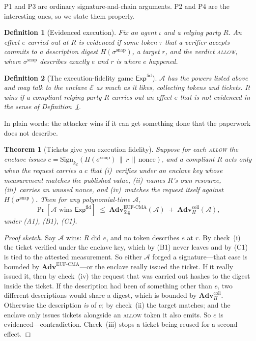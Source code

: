 \documentclass[11pt]{article}
\newtheorem{definition}{Definition}
\newtheorem{theorem}{Theorem}
\begin{document}
P1 and P3 are ordinary signature-and-chain arguments. P2 and P4 are the
interesting ones, so we state them properly.

\begin{definition}[Evidenced execution]
\label{def:evidenced}
Fix an agent $\iota$ and a relying party $R$. An effect $e$ carried out at $R$
is \emph{evidenced} if some token $\tau$ that a verifier accepts commits to a
description digest $H(\sigma^{\mathrm{snap}})$, a target $r$, and the verdict
\textsc{allow}, where $\sigma^{\mathrm{snap}}$ describes exactly $e$ and $r$
is where $e$ happened.
\end{definition}

\begin{definition}[The execution-fidelity game $\mathsf{Exp}^{\mathrm{fid}}$]
$\mathcal{A}$ has the powers listed above and may talk to the enclave
$\mathcal{E}$ as much as it likes, collecting tokens and tickets. It wins if a
compliant relying party $R$ carries out an effect $e$ that is not evidenced in
the sense of Definition~\ref{def:evidenced}.
\end{definition}

In plain words: the attacker wins if it can get something done that the
paperwork does not describe.

\begin{theorem}[Tickets give you execution fidelity]
\label{thm:fidelity}
Suppose for each \textsc{allow} the enclave issues
$c = \mathrm{Sign}_{k_{\mathcal{E}}}(H(\sigma^{\mathrm{snap}}) \,\|\, r
\,\|\, \mathrm{nonce})$, and a compliant $R$ acts only when the request
carries a $c$ that (i)~verifies under an enclave key whose measurement matches
the published value, (ii)~names $R$'s own resource, (iii)~carries an unused
nonce, and (iv)~matches the request itself against
$H(\sigma^{\mathrm{snap}})$. Then for any polynomial-time $\mathcal{A}$,
\[
\Pr[\mathcal{A} \text{ wins } \mathsf{Exp}^{\mathrm{fid}}]
\;\le\; \mathbf{Adv}^{\mathrm{EUF\text{-}CMA}}_{\mathrm{Sig}}(\mathcal{A})
\;+\; \mathbf{Adv}^{\mathrm{coll}}_{H}(\mathcal{A}),
\]
under (A1), (B1), (C1).
\end{theorem}

\begin{proof}[Proof sketch]
Say $\mathcal{A}$ wins: $R$ did $e$, and no token describes $e$ at $r$. By
check~(i) the ticket verified under the enclave key, which by (B1) never
leaves and by (C1) is tied to the attested measurement. So either
$\mathcal{A}$ forged a signature---that case is bounded by
$\mathbf{Adv}^{\mathrm{EUF\text{-}CMA}}$---or the enclave really issued the
ticket. If it really issued it, then by check~(iv) the request that was
carried out hashes to the digest inside the ticket. If the description had
been of something other than $e$, two different descriptions would share a
digest, which is bounded by $\mathbf{Adv}^{\mathrm{coll}}_{H}$. Otherwise the
description \emph{is} of $e$; by check~(ii) the target matches; and the
enclave only issues tickets alongside an \textsc{allow} token it also emits.
So $e$ is evidenced---contradiction. Check~(iii) stops a ticket being reused
for a second effect. \end{proof}
\end{document}
